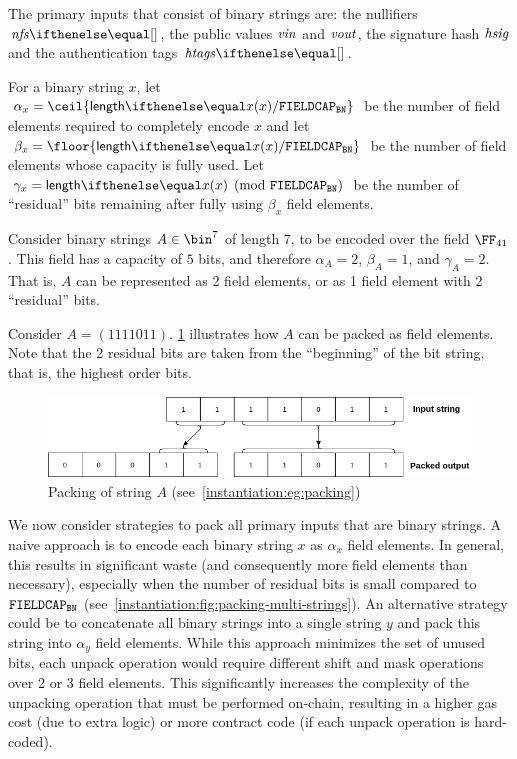 The primary inputs that consist of binary strings are: the nullifiers $\nfs{}$, the public values $\mathit{vin}$ and $\mathit{vout}$, the signature hash $\mathit{hsig}$ and the authentication tags $\htags{}$.

For a binary string $x$, let $\alpha_x = \ceil{\len{x} / \bnFieldBitCap}$ be the number of field elements required to completely encode $x$ and let $\beta_x = \floor{\len{x} / \bnFieldBitCap}$ be the number of field elements whose capacity is fully used. Let $\gamma_x = \len{x} \pmod{\bnFieldBitCap}$ be the number of ``residual'' bits remaining after fully using $\beta_x$ field elements.

\begin{example}\label{instantiation:eg:packing}
    Consider binary strings $A \in \bin^7$ of length 7, to be encoded over the field $\FFx{41}$. This field has a capacity of $5$ bits, and therefore $\alpha_A = 2$, $\beta_A = 1$, and $\gamma_A = 2$. That is, $A$ can be represented as 2 field elements, or as 1 field element with 2 ``residual'' bits.

    Consider $A = (1111011)$. \cref{instantiation:fig:packingA} illustrates how $A$ can be packed as field elements. Note that the 2 residual bits are taken from the ``beginning'' of the bit string, that is, the highest order bits.
\end{example}

\begin{figure}[ht]
    \centering
    \includegraphics[width=1\textwidth]{images/bit-packing-stringA.png}
    \caption{Packing of string $A$ (see~\cref{instantiation:eg:packing})}\label{instantiation:fig:packingA}
\end{figure}

We now consider strategies to pack all primary inputs that are binary strings. A naive approach is to encode each binary string $x$ as $\alpha_x$ field elements. In general, this results in significant waste (and consequently more field elements than necessary), especially when the number of residual bits is small compared to $\mathtt{FIELDCAP_{BN}}$ (see~\cref{instantiation:fig:packing-multi-strings}). An alternative strategy could be to concatenate all binary strings into a single string $y$ and pack this string into $\alpha_y$ field elements. While this approach minimizes the set of unused bits, each unpack operation would require different shift and mask operations over 2 or 3 field elements. This significantly increases the complexity of the unpacking operation that must be performed on-chain, resulting in a higher gas cost (due to extra logic) or more contract code (if each unpack operation is hard-coded).

